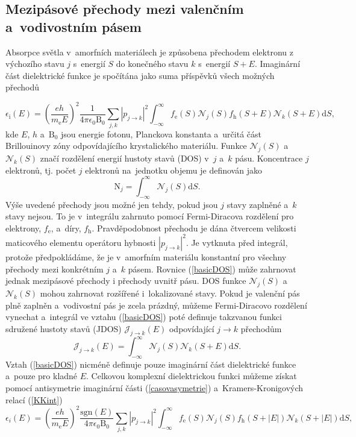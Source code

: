 \subsection{Mezipásové přechody mezi valenčním a~vodivostním pásem}
Absorpce světla v~amorfních materiálech je způsobena přechodem elektronu z výchozího stavu $j$ s~energií $S$ do konečného stavu $k$ s~energií $S + E$. Imaginární část dielektrické funkce je spočítána jako suma příspěvků všech možných přechodů \cite{Franta2007}

\begin{equation}
\label{basicDOS}
\epsilon_\mathrm{i} (E) = 
\left(\frac{eh}{m_\mathrm{e}E} \right)^2 \frac{1}{4 \pi \epsilon_0 \mathrm{B}_0} \sum_{j,k} | p_{j \rightarrow k} |^2
\int_{-\infty}^\infty f_\mathrm{e}(S) \mathcal{N}_j(S) f_\mathrm{h}(S+E) \mathcal{N}_k(S + E)\mathrm{d}S \text{,}
\end{equation}
kde $E$, $h$ a~$\mathrm{B}_0$ jsou energie fotonu, Planckova konstanta a~určitá část Brillouinovy zóny odpovídajícího krystalického materiálu. Funkce $\mathcal{N}_j(S)$ a~$\mathcal{N}_k(S)$ značí rozdělení energií hustoty stavů (DOS) v~$j$ a~$k$ pásu. Koncentrace $j$ elektronů, tj. počet $j$ elektronů na~jednotku objemu je definován jako
\begin{equation}
\mathrm{N}_j = \int_{-\infty}^\infty \mathcal{N}_j(S)\mathrm{d}S \text{.}
\end{equation}
Výše uvedené přechody jsou možné jen tehdy, pokud jsou $j$ stavy zaplněné a~$k$ stavy nejsou. To je v~integrálu zahrnuto pomocí Fermi-Diracova rozdělení pro elektrony, $f_\mathrm{e}$, a~díry, $f_\mathrm{h}$. Pravděpodobnost přechodu je dána čtvercem velikosti maticového elementu operátoru hybnosti $|p_{j \rightarrow k}|^2$. Je vytknuta před integrál, protože předpokládáme, že je v~amorfním materiálu konstantní pro všechny přechody mezi konkrétním $j$ a~$k$ pásem. Rovnice (\ref{basicDOS}) může zahrnovat jednak mezipásové přechody i přechody uvnitř pásu. DOS funkce $\mathcal{N}_j(S)$ a~$\mathcal{N}_k(S)$ mohou zahrnovat rozšířené i~lokalizované stavy. Pokud je valenční pás plně zaplněn a~vodivostní pás je zcela prázdný, můžeme Fermi-Diracovo rozdělení vynechat a~integrál ve vztahu (\ref{basicDOS}) poté definuje takzvanou funkci sdružené hustoty stavů (JDOS) $\mathcal{J}_{j \rightarrow k}(E)$ odpovídající $j \rightarrow k$ přechodům
\begin{equation}
\mathcal{J}_{j \rightarrow k}(E) = \int_{-\infty}^\infty \mathcal{N}_j(S) \mathcal{N}_k(S + E)\mathrm{d}S \text{.}
\end{equation}
Vztah (\ref{basicDOS}) nicméně definuje pouze imaginární část dielektrické funkce a~pouze pro kladné $E$. Celkovou komplexní dielektrickou funkci můžeme získat pomocí antisymetrie imaginární části (\ref{casovasymetrie}) a~Kramers-Kronigových relací (\ref{KKint})
\begin{equation}
\label{basicDLC2}
\epsilon_i (E) = 
\left(\frac{eh}{m_\mathrm{e}E} \right)^2 \frac{\mathrm{sgn}(E)}{4 \pi \epsilon_0 \mathrm{B}_0} \sum_{j,k} | p_{j \rightarrow k} |^2
\int_{-\infty}^\infty f_\mathrm{e}(S) \mathcal{N}_j(S) f_\mathrm{h}(S+|E|) \mathcal{N}_k(S + |E|)\mathrm{d}S \text{,}
\end{equation}


